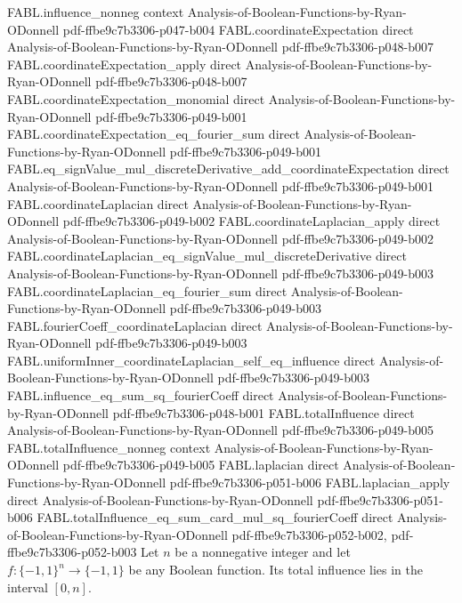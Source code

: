 \begin{theorem}
\proofstep
  {FABL.influence_nonneg}
  {context}
  {Analysis-of-Boolean-Functions-by-Ryan-ODonnell}
  {pdf-ffbe9c7b3306-p047-b004}
\proofstep
  {FABL.coordinateExpectation}
  {direct}
  {Analysis-of-Boolean-Functions-by-Ryan-ODonnell}
  {pdf-ffbe9c7b3306-p048-b007}
\proofstep
  {FABL.coordinateExpectation_apply}
  {direct}
  {Analysis-of-Boolean-Functions-by-Ryan-ODonnell}
  {pdf-ffbe9c7b3306-p048-b007}
\proofstep
  {FABL.coordinateExpectation_monomial}
  {direct}
  {Analysis-of-Boolean-Functions-by-Ryan-ODonnell}
  {pdf-ffbe9c7b3306-p049-b001}
\proofstep
  {FABL.coordinateExpectation_eq_fourier_sum}
  {direct}
  {Analysis-of-Boolean-Functions-by-Ryan-ODonnell}
  {pdf-ffbe9c7b3306-p049-b001}
\proofstep
  {FABL.eq_signValue_mul_discreteDerivative_add_coordinateExpectation}
  {direct}
  {Analysis-of-Boolean-Functions-by-Ryan-ODonnell}
  {pdf-ffbe9c7b3306-p049-b001}
\proofstep
  {FABL.coordinateLaplacian}
  {direct}
  {Analysis-of-Boolean-Functions-by-Ryan-ODonnell}
  {pdf-ffbe9c7b3306-p049-b002}
\proofstep
  {FABL.coordinateLaplacian_apply}
  {direct}
  {Analysis-of-Boolean-Functions-by-Ryan-ODonnell}
  {pdf-ffbe9c7b3306-p049-b002}
\proofstep
  {FABL.coordinateLaplacian_eq_signValue_mul_discreteDerivative}
  {direct}
  {Analysis-of-Boolean-Functions-by-Ryan-ODonnell}
  {pdf-ffbe9c7b3306-p049-b003}
\proofstep
  {FABL.coordinateLaplacian_eq_fourier_sum}
  {direct}
  {Analysis-of-Boolean-Functions-by-Ryan-ODonnell}
  {pdf-ffbe9c7b3306-p049-b003}
\proofstep
  {FABL.fourierCoeff_coordinateLaplacian}
  {direct}
  {Analysis-of-Boolean-Functions-by-Ryan-ODonnell}
  {pdf-ffbe9c7b3306-p049-b003}
\proofstep
  {FABL.uniformInner_coordinateLaplacian_self_eq_influence}
  {direct}
  {Analysis-of-Boolean-Functions-by-Ryan-ODonnell}
  {pdf-ffbe9c7b3306-p049-b003}
\proofstep
  {FABL.influence_eq_sum_sq_fourierCoeff}
  {direct}
  {Analysis-of-Boolean-Functions-by-Ryan-ODonnell}
  {pdf-ffbe9c7b3306-p048-b001}
\proofstep
  {FABL.totalInfluence}
  {direct}
  {Analysis-of-Boolean-Functions-by-Ryan-ODonnell}
  {pdf-ffbe9c7b3306-p049-b005}
\proofstep
  {FABL.totalInfluence_nonneg}
  {context}
  {Analysis-of-Boolean-Functions-by-Ryan-ODonnell}
  {pdf-ffbe9c7b3306-p049-b005}
\proofstep
  {FABL.laplacian}
  {direct}
  {Analysis-of-Boolean-Functions-by-Ryan-ODonnell}
  {pdf-ffbe9c7b3306-p051-b006}
\proofstep
  {FABL.laplacian_apply}
  {direct}
  {Analysis-of-Boolean-Functions-by-Ryan-ODonnell}
  {pdf-ffbe9c7b3306-p051-b006}
\proofstep
  {FABL.totalInfluence_eq_sum_card_mul_sq_fourierCoeff}
  {direct}
  {Analysis-of-Boolean-Functions-by-Ryan-ODonnell}
  {pdf-ffbe9c7b3306-p052-b002,
    pdf-ffbe9c7b3306-p052-b003}
Let $n$ be a nonnegative integer and let $f:\{-1,1\}^n\to\{-1,1\}$ be any Boolean
function. Its total influence lies in the interval $[0,n]$.
\end{theorem}

